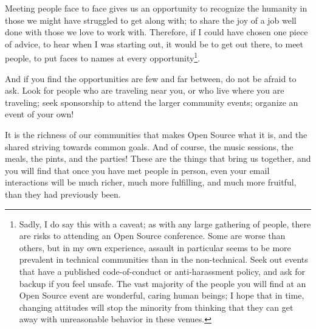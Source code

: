 Meeting people face to face gives us an opportunity to recognize the
humanity in those we might have struggled to get along with; to share
the joy of a job well done with those we love to work with. Therefore,
if I could have chosen one piece of advice, to hear when I was
starting out, it would be to get out there, to meet people, to put
faces to names at every opportunity\footnote{Sadly, I do say this with a caveat;
as with any large gathering of
people, there are risks to attending an Open Source conference. Some
are worse than others, but in my own experience, assault in particular
seems to be more prevalent in technical communities than in the
non-technical. Seek out events that have a published code-of-conduct
or anti-harassment policy, and ask for backup if you feel unsafe. The
vast majority of the people you will find at an Open Source event are
wonderful, caring human beings; I hope that in time, changing
attitudes will stop the minority from thinking that they can get away
with unreasonable behavior in these venues.}.

And if you find the opportunities are few and far between, do not be
afraid to ask. Look for people who are traveling near you, or who
live where you are traveling; seek sponsorship to attend the larger
community events; organize an event of your own!

It is the richness of our communities that makes Open Source what it
is, and the shared striving towards common goals. And of course, the
music sessions, the meals, the pints, and the parties! These are the
things that bring us together, and you will find that once you have met
people in person, even your email interactions will be much richer,
much more fulfilling, and much more fruitful, than they had previously
been.
